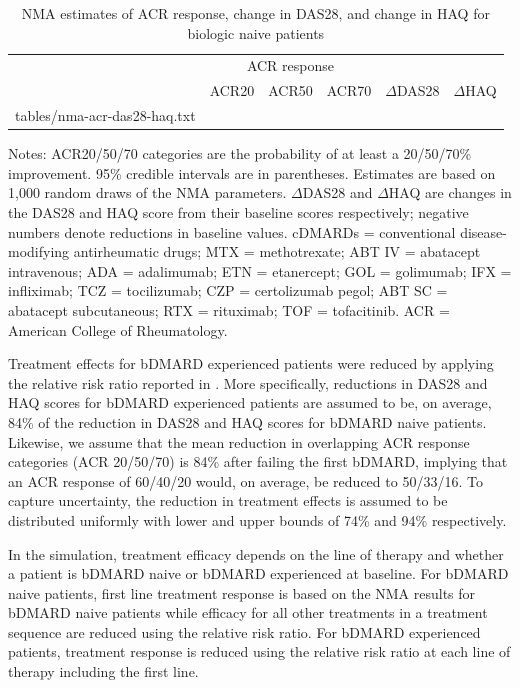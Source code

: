 \documentclass[11pt,final,fleqn]{article}\usepackage[]{graphicx}\usepackage[]{color}
\makeatletter
\theoremstyle{plain}
\newcommand*\ExpandableInput[1]{\@@input#1 }
\makeatother
\begin{document}
\begin{table}
\begin{center}
\begin{threeparttable}
\caption{NMA estimates of ACR response, change in DAS28, and change in HAQ for biologic naive patients} \label{tbl:nma-acr-das28-haq}
\small
\begin{tabular}{lccccc}
\hline
\multicolumn{1}{c}{} & \multicolumn{3}{c}{ACR response} & \multicolumn{2}{c}{}\\
\cmidrule(lr){2-4} 
\multicolumn{1}{l}{} & \multicolumn{1}{c}{ACR20} & \multicolumn{1}{c}{ACR50} & \multicolumn{1}{c}{ACR70} & \multicolumn{1}{c}{$\Delta$DAS28} & \multicolumn{1}{c}{$\Delta$HAQ} \\
\hline
\ExpandableInput{tables/nma-acr-das28-haq.txt}
\hline
\end{tabular}
\scriptsize
Notes: ACR20/50/70 categories are the probability of at least a 20/50/70\% improvement. 95\% credible intervals are in parentheses. Estimates are based on 1,000 random draws of the NMA parameters. $\Delta$DAS28 and $\Delta$HAQ are changes in the DAS28 and HAQ score from their baseline scores respectively; negative numbers denote reductions in baseline values. cDMARDs = conventional disease-modifying antirheumatic drugs; MTX = methotrexate; ABT IV = abatacept intravenous; ADA = adalimumab; ETN = etanercept; GOL = golimumab; IFX = infliximab; TCZ = tocilizumab; CZP = certolizumab pegol; ABT SC = abatacept subcutaneous; RTX = rituximab; TOF = tofacitinib. ACR = American College of Rheumatology.
\end{threeparttable}
\end{center}
\end{table}


Treatment effects for bDMARD experienced patients were reduced by applying the relative risk ratio reported in \citet{carlson2015economic}. More specifically, reductions in DAS28 and HAQ scores for bDMARD experienced patients are assumed to be, on average, 84\% of the reduction in DAS28 and HAQ scores for bDMARD naive patients. Likewise, we assume that the mean reduction in overlapping ACR response categories (ACR 20/50/70) is 84\% after failing the first bDMARD, implying that an ACR response of 60/40/20 would, on average, be reduced to 50/33/16. To capture uncertainty, the reduction in treatment effects is assumed to be distributed uniformly with lower and upper bounds of 74\% and 94\% respectively. 

In the simulation, treatment efficacy depends on the line of therapy and whether a patient is bDMARD naive or bDMARD experienced at baseline. For bDMARD naive patients, first line treatment response is based on the NMA results for bDMARD naive patients while efficacy for all other treatments in a treatment sequence are reduced using the relative risk ratio. For bDMARD experienced patients, treatment response is reduced using the relative risk ratio at each line of therapy including the first line. 
\end{document}
